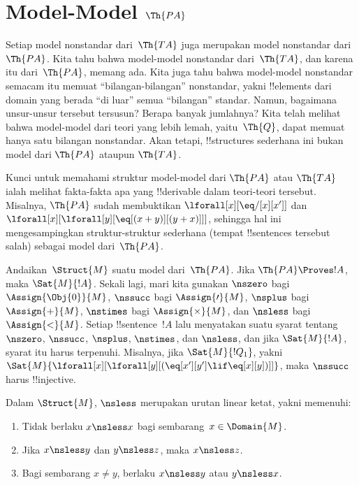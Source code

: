 \documentclass[../../../include/open-logic-section]{subfiles}
\begin{document}
\section{Model-Model $\Th{PA}$}

\begin{explain}
Setiap model nonstandar dari~$\Th{TA}$ juga merupakan model nonstandar
dari~$\Th{PA}$. Kita tahu bahwa model-model nonstandar dari~$\Th{TA}$, dan
karena itu dari~$\Th{PA}$, memang ada. Kita juga tahu bahwa model-model
nonstandar semacam itu memuat ``bilangan-bilangan'' nonstandar, yakni
!!{element}s dari domain yang berada ``di luar'' semua ``bilangan'' standar.
Namun, bagaimana unsur-unsur tersebut tersusun? Berapa banyak jumlahnya? Kita
telah melihat bahwa model-model dari teori yang lebih lemah, yaitu~$\Th{Q}$,
dapat memuat hanya satu bilangan nonstandar. Akan tetapi, !!{structure}s
sederhana ini bukan model dari $\Th{PA}$ ataupun $\Th{TA}$.

Kunci untuk memahami struktur model-model dari $\Th{PA}$ atau $\Th{TA}$
ialah melihat fakta-fakta apa yang !!{derivable} dalam teori-teori tersebut.
Misalnya, $\Th{PA}$ sudah membuktikan $\lforall[x][\eq/[x][x']]$ dan
$\lforall[x][\lforall[y][\eq[(x+y)][(y+x)]]]$, sehingga hal ini
mengesampingkan struktur-struktur sederhana (tempat !!{sentence}s tersebut
salah) sebagai model dari~$\Th{PA}$.

Andaikan~$\Struct{M}$ suatu model dari~$\Th{PA}$. Jika
$\Th{PA} \Proves !A$, maka $\Sat{M}{!A}$. Sekali lagi, mari kita gunakan
$\nszero$ bagi $\Assign{\Obj{0}}{M}$, $\nssucc$ bagi
$\Assign{\prime}{M}$, $\nsplus$ bagi $\Assign{+}{M}$, $\nstimes$ bagi
$\Assign{\times}{M}$, dan $\nsless$ bagi $\Assign{<}{M}$. Setiap
!!{sentence}~$!A$ lalu menyatakan suatu syarat tentang $\nszero$, $\nssucc$,
$\nsplus$, $\nstimes$, dan $\nsless$, dan jika $\Sat{M}{!A}$, syarat itu
harus terpenuhi. Misalnya, jika $\Sat{M}{!Q_1}$, yakni
$\Sat{M}{\lforall[x][\lforall[y][(\eq[x'][y'] \lif \eq[x][y])]]}$, maka
$\nssucc$ harus !!{injective}.
\end{explain}

\begin{prop}
Dalam $\Struct{M}$, $\nsless$ merupakan urutan linear ketat, yakni memenuhi:
\begin{enumerate}
\item Tidak berlaku $x \nsless x$ bagi sembarang~$x \in \Domain{M}$.
\item Jika $x \nsless y$ dan $y \nsless z$, maka $x \nsless z$.
\item Bagi sembarang $x \neq y$, berlaku $x \nsless y$ atau $y \nsless x$.
\end{enumerate}
\end{prop}
\end{document}
